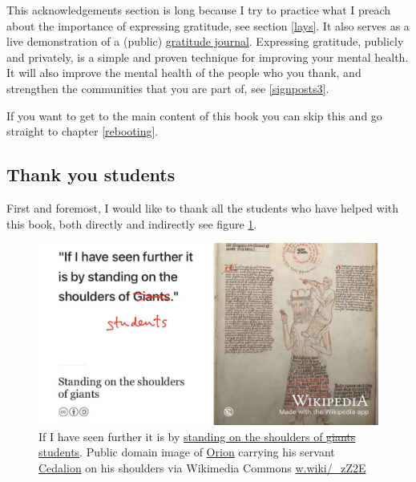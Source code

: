 \documentclass[
]{book}
\begin{document}
This acknowledgements section is long because I try to practice what I preach about the importance of expressing gratitude, see section \ref{lays}. It also serves as a live demonstration of a (public) \href{https://en.wikipedia.org/wiki/Gratitude_journal}{gratitude journal}. Expressing gratitude, publicly and privately, is a simple and proven technique for improving your mental health. It will also improve the mental health of the people who you thank, and strengthen the communities that you are part of, see \ref{signposts3}.

If you want to get to the main content of this book you can skip this and go straight to chapter \ref{rebooting}.

\hypertarget{students}{%
\subsection{Thank you students}\label{students}}

First and foremost, I would like to thank all the students who have helped with this book, both directly and indirectly see figure \ref{fig:giants-fig}.

\begin{figure}

{\centering \includegraphics[width=1\linewidth]{images/standing-on-the-shoulders-of-students} 

}

\caption{If I have seen further it is by \href{https://en.wikipedia.org/wiki/Standing_on_the_shoulders_of_giants}{standing on the shoulders of \sout{giants} students}. \citep{newton} Public domain image of \href{https://en.wikipedia.org/wiki/Orion_(mythology)}{Orion} carrying his servant \href{https://en.wikipedia.org/wiki/Cedalion}{Cedalion} on his shoulders via Wikimedia Commons \href{https://w.wiki/_zZ2E}{w.wiki/\_zZ2E}}\label{fig:giants-fig}
\end{figure}
\end{document}
